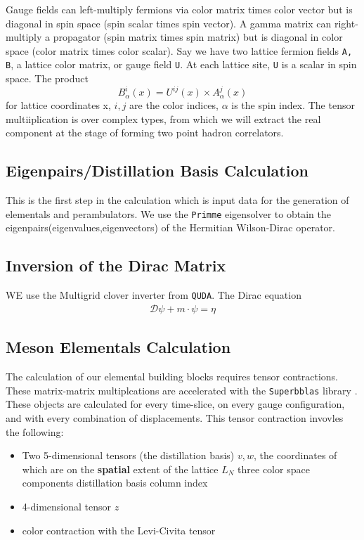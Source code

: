   Gauge fields can left-multiply fermions via color matrix times color
  vector but is diagonal in spin space (spin scalar times spin vector).
  A gamma matrix can right-multiply a propagator (spin matrix times
  spin matrix) but is diagonal in color space (color matrix times color
  scalar). Say we have two lattice fermion fields \texttt{A, B}, a lattice color matrix, or gauge field \texttt{U}. At each lattice site, \texttt{U} is a scalar in spin space. The product 
  \begin{equation}
    B_\alpha^i (x) = U^{ij}(x) \times A_\alpha^j(x)
  \end{equation} for lattice coordinates x, $i,j$ are the color indices, $\alpha$ is the spin index. The tensor multiiplication is over complex types, from which we will extract the real component at the stage of forming two point hadron correlators.  

  
\subsection{Eigenpairs/Distillation Basis Calculation}
This is the first step in the calculation which is input data for the generation of elementals and perambulators. We use the \verb|Primme| eigensolver to obtain the eigenpairs(eigenvalues,eigenvectors) of the Hermitian Wilson-Dirac operator\cite{PRIMME}\cite{Frommer:2020ovr}. 

\subsection{Inversion of the Dirac Matrix}
WE use the Multigrid clover inverter from \texttt{QUDA}. 
The Dirac equation 
\begin{align}
  \mathcal{D}\psi + m \cdot \psi = \eta
\end{align}


\subsection{Meson Elementals Calculation}
The calculation of our elemental building blocks requires tensor contractions. These matrix-matrix multiplcations are accelerated with the \texttt{Superbblas} library \cite{dinapoli2013efficientuseblaslibrary}. These objects are calculated for every time-slice, on every gauge configuration, and with every combination of displacements. This tensor contraction invovles the following\cite{romero_efficient_2020}: 
\begin{itemize}
  \item Two 5-dimensional tensors (the distillation basis) $v,w$, the coordinates of which are on the \textbf{spatial} extent of the lattice $L_N$
  \subitem three color space components 
  \subitem distillation basis column index 
  \item  4-dimensional tensor $z$ 
  \item color contraction with the Levi-Civita tensor  
\end{itemize}


